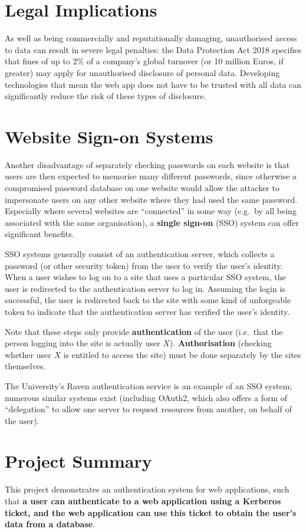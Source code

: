 \documentclass[12pt]{report}
\begin{document}
\section{Legal Implications}
As well as being commercially and reputationally damaging, unauthorised access to data can result in severe legal penalties: the Data Protection Act 2018 specifies that fines of up to 2\% of a company's global turnover (or 10 million Euros, if greater) may apply for unauthorised disclosure of personal data\cite{GDPR}. Developing technologies that mean the web app does not have to be trusted with all data can significantly reduce the risk of these types of disclosure.

\section{Website Sign-on Systems}
Another disadvantage of separately checking passwords on each website is that users are then expected to memorise many different passwords, since otherwise a compromised password database on one website would allow the attacker to impersonate users on any other website where they had used the same password. Especially where several websites are ``connected'' in some way (e.g.\ by all being associated with the same organisation), a \textbf{single sign-on} (SSO) system can offer significant benefits.

SSO systems generally consist of an authentication server, which collects a password (or other security token) from the user to verify the user's identity. When a user wishes to log on to a site that uses a particular SSO system, the user is redirected to the authentication server to log in. Assuming the login is successful, the user is redirected back to the site with some kind of unforgeable token to indicate that the authentication server has verified the user's identity.

Note that these steps only provide \textbf{authentication} of the user (i.e.\ that the person logging into the site is actually user $X$). \textbf{Authorisation} (checking whether user $X$ is entitled to access the site) must be done separately by the sites themselves.

The University's Raven authentication service is an example of an SSO system; numerous similar systems exist (including OAuth2, which also offers a form of ``delegation'' to allow one server to request resources from another, on behalf of the user\cite{Oracle-OAuth2}).

\section{Project Summary}
\label{sec:project_summary}
This project demonstrates an authentication system for web applications, such that \textbf{a user can authenticate to a web application using a Kerberos ticket, and the web application can use this ticket to obtain the user's data from a database}.
\end{document}
